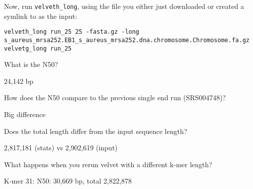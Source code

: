 \begin{steps}
Now, run \texttt{velveth\_long}, using the file you either just downloaded or created a
symlink to as the input:
\begin{lstlisting}
velveth_long run_25 25 -fasta.gz -long s_aureus_mrsa252.EB1_s_aureus_mrsa252.dna.chromosome.Chromosome.fa.gz
velvetg_long run_25
\end{lstlisting}

\end{steps}

\begin{questions}
What is the N50?
\begin{answer}
24,142 bp
\end{answer}

How does the N50 compare to the previous single end run (SRS004748)?
\begin{answer}
Big difference
\end{answer}
  
Does the total length differ from the input sequence length?
\begin{answer}
2,817,181 (stats) vs 2,902,619 (input)
\end{answer}
  
What happens when you rerun velvet with a different k-mer length?
\begin{answer}
K-mer 31: N50: 30,669 bp, total 2,822,878
\end{answer}

\end{questions}